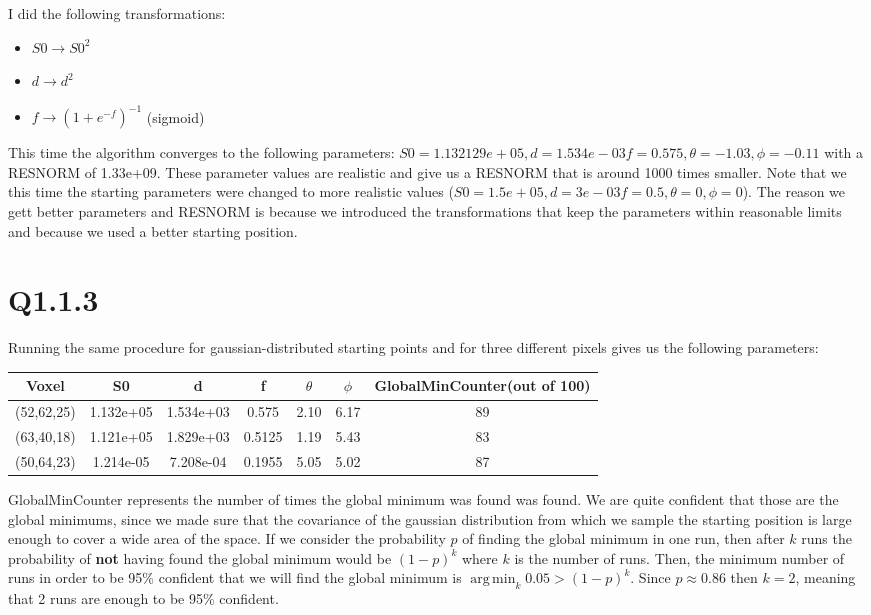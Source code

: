 \documentclass[11pt,a4paper,oneside]{report}
\DeclareMathOperator*{\argmin}{arg\,min}
\begin{document}
I did the following transformations:
\begin{itemize}
 \item $S0 \to S0^2$
 \item $d \to d^2$
 \item $f \to (1+e^{-f})^{-1}$ (sigmoid)
\end{itemize}
This time the algorithm converges to the following parameters: $S0 = 1.132129e+05, d=1.534e-03 f=0.575, \theta=-1.03,  \phi=-0.11$ with a RESNORM of 1.33e+09. These parameter values are realistic and give us a RESNORM that is around 1000 times smaller. Note that we this time the starting parameters were changed to more realistic values ($S0 = 1.5e+05, d=3e-03 f=0.5, \theta=0,  \phi=0$). The reason we gett better parameters and RESNORM is because we introduced the transformations that keep the parameters within reasonable limits and because we used a better starting position.

\section*{Q1.1.3}
Running the same procedure for gaussian-distributed starting points and for three different pixels gives us the following parameters:
\begin{center}
\begin{tabular}{c | c | c | c | c | c | c}
Voxel & S0 & d & f & $\theta$ & $\phi$ & GlobalMinCounter(out of 100)\\
\hline
(52,62,25) & 1.132e+05 & 1.534e+03 & 0.575 & 2.10 & 6.17 & 89\\
(63,40,18) & 1.121e+05 & 1.829e+03 & 0.5125 & 1.19 & 5.43 & 83\\
(50,64,23) & 1.214e-05 & 7.208e-04 & 0.1955 & 5.05 & 5.02 & 87\\
\end{tabular}
\end{center}

GlobalMinCounter represents the number of times the global minimum was found was found. We are quite confident that those are the global minimums, since we made sure that the covariance of the gaussian distribution from which we sample the starting position is large enough to cover a wide area of the space. If we consider the probability $p$ of finding the global minimum in one run, then after $k$ runs the probability of \textbf{not} having found the global minimum would be $(1-p)^k$ where $k$ is the number of runs. Then, the minimum number of runs in order to be 95\% confident that we will find the global minimum is $\argmin_{k} 0.05 > (1-p)^k$. Since $p \approx 0.86$ then $k = 2$, meaning that 2 runs are enough to be 95\% confident.
\end{document}
